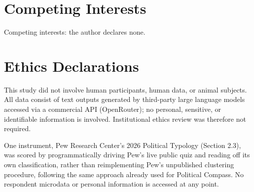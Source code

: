 \documentclass[12pt]{article}
\begin{document}
\section*{Competing Interests}

Competing interests: the author declares none.

\section*{Ethics Declarations}

This study did not involve human participants, human data, or animal
subjects. All data consist of text outputs generated by third-party large
language models accessed via a commercial API (OpenRouter); no personal,
sensitive, or identifiable information is involved. Institutional ethics
review was therefore not required.

One instrument, Pew Research Center's 2026 Political Typology (Section
2.3), was scored by programmatically driving Pew's live public quiz and
reading off its own classification, rather than reimplementing Pew's
unpublished clustering procedure, following the same approach already used
for Political Compass. No respondent microdata or personal information is
accessed at any point.

\clearpage


\end{document}
